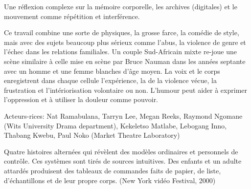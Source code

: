 {{Une r\'eflexion complexe sur la m\'emoire corporelle, les archives
(digitales) et le mouvement comme r\'ep\'etition et interf\'erence.


Ce travail combine une sorte de  physiques, la grosse farce, la comédie de style, mais avec des sujets beaucoup plus sérieux comme l'abus, la violence de genre et l'\'echec dans les relations familiales.
Un couple
Sud{}-Africain mixte re{}-joue une sc\`ene similaire \`a celle mise en
sc\`ene par Bruce Nauman dans les ann\'ees septante avec un homme et
une femme blanches d'\^age moyen. La voix et le corps
enregistrent dans chaque cellule l'exp\'erience, la
 de la violence v\'ecue, la frustration et
l'int\'eriorisation volontaire ou non.
L'humour peut aider \`a exprimer
l'oppression et \`a utiliser la douleur comme pouvoir.

Acteurs{}-rices: Nat Ramabulana, Tarryn Lee, Megan Reeks, Raymond
Ngomane (Wits University Drama department), Kekeletso Matlabe, Lebogang
Inno, Thabang Kwebu, Paul Noko (Market Theatre Laboratory) 
\blank
{}

Quatre histoires altern\'ees qui r\'ev\`elent des mod\`eles ordinaires
et personnels de contr\^ole. Ces syst\`emes sont tir\'es de sources
intuitives. Des enfants et un adulte attard\'es produisent des tableaux
de commandes faits de papier, de liste,
d'\'echantillons et de leur propre corps.
\blank
{} (New York vid\'eo Festival, 2000)
\blank
{}

}}
